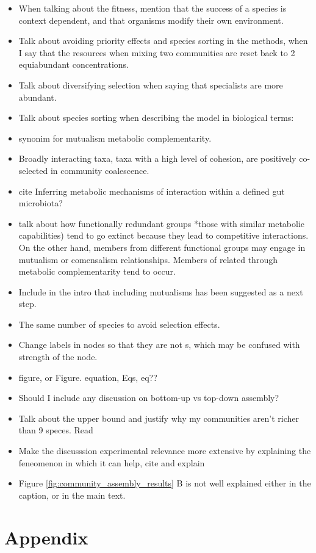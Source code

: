 \documentclass[titlepage,11pt]{article}
\begin{document}
\begin{linenumbers}
\begin{singlespace}
\begin{itemize}
	\item When talking about the fitness, mention that the success of a species is context dependent, and that organisms modify their own environment.
	\item Talk about avoiding priority effects and species sorting in the methods, when I say that the resources when mixing two communities are reset back to 2 equiabundant concentrations.
	\item Talk about diversifying selection when saying that specialists are more abundant.
	\item Talk about species sorting when describing the model in biological terms: 
	\item synonim for mutualism metabolic complementarity.
	\item Broadly interacting taxa, taxa with a high level of cohesion, are positively co-selected in community coalescence.
	\item cite Inferring metabolic mechanisms of interaction within a defined gut microbiota?
	\item talk about how functionally redundant groups *those with similar metabolic capabilities) tend to go extinct because they lead to competitive interactions. On the other hand, members from different functional groups may engage in mutualism or comensalism relationships. Members of related through metabolic complementarity tend to occur.
	\item Include in the intro that including mutualisms has been suggested as a next step.
	\item The same number of species to avoid selection effects.
	\item Change labels in nodes so that they are not s, which may be confused with strength of the node.
	\item figure, or Figure. equation, Eqs, eq??
	\item Should I include any discussion on bottom-up vs top-down assembly?
	\item Talk about the upper bound and justify why my communities aren't richer than  9 speces. Read \citet{Cui2020}	
	\item Make the discusssion experimental relevance more extensive by explaining the feneomenon in which it can help, cite and explain \citet{Calderon2017}
	\item Figure \ref{fig:community_assembly_results} B is not well explained either in the caption, or in the main text.
\end{itemize}
\newpage
\section{Appendix}

\end{singlespace}
\end{linenumbers}
\end{document}
